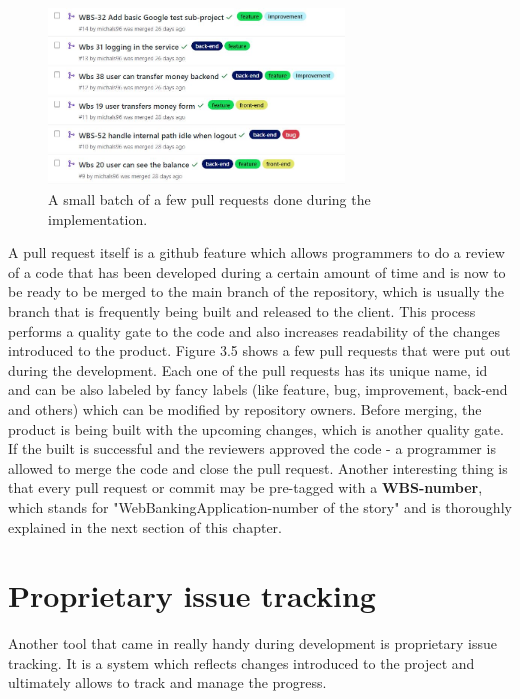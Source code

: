 \documentclass[a4paper,12pt]{book}
\newcommand\tab[1][1cm]{\hspace*{#1}}
\begin{document}
{\begin{figure}[H]
  \centering
    \includegraphics[width=0.7\textwidth]{pullrequests}
    \caption{A small batch of a few pull requests done during the implementation.~\cite{repo}}
\end{figure} 
    
A pull request itself is a github feature which allows programmers to do a review of a code that has been developed during a certain amount of time and is now to be ready to be merged to the main branch of the repository, which is usually the branch that is frequently being built and released to the client. This process performs a quality gate to the code and also increases readability of the changes introduced to the product. Figure 3.5 shows a few pull requests that were put out during the development. Each one of the pull requests has its unique name, id and can be also labeled by fancy labels (like feature, bug, improvement, back-end and others) which can be modified by repository owners. Before merging, the product is being built with the upcoming changes, which is another quality gate. If the built is successful and the reviewers approved the code - a programmer is allowed to merge the code and close the pull request. Another interesting thing is that every pull request or commit may be pre-tagged with a \textbf{WBS-number}, which stands for "WebBankingApplication-number of the story" and is thoroughly explained in the next section of this chapter. 
}
\section{Proprietary issue tracking}
{
\tab Another tool that came in really handy during development is proprietary issue tracking. It is a system which reflects changes introduced to the project and ultimately allows to track and manage the progress. 
}
\end{document}
